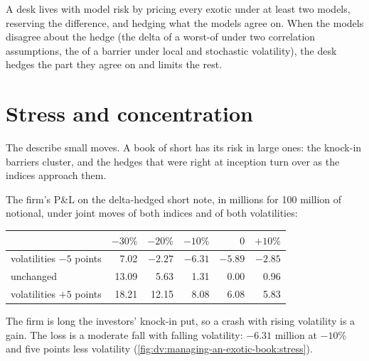 A desk lives with model risk by pricing every exotic under at least two models, reserving the difference, and hedging what the models agree on. When the models
disagree about the hedge (the delta of a worst-of under two correlation assumptions, the  of a barrier under local and stochastic volatility), the desk hedges
the part they agree on and limits the rest.

\section{Stress and concentration}

The  describe small moves. A book of short  has its risk in large ones: the knock-in barriers cluster, and the hedges that were right at inception
turn over as the indices approach them.

\begin{example}\label{ex:dv:managing-an-exotic-book:stress}
The firm's P\&L on the delta-hedged short note, in millions for 100 million of notional, under joint moves of both indices and of both volatilities:
\begin{center}\small
\begin{tabular}{lrrrrr}
\toprule
& $-30\%$ & $-20\%$ & $-10\%$ & $0$ & $+10\%$\\
\midrule
volatilities $-5$ points & 7.02 & $-2.27$ & $-6.31$ & $-5.89$ & $-2.85$\\
unchanged & 13.09 & 5.63 & 1.31 & 0.00 & 0.96\\
volatilities $+5$ points & 18.21 & 12.15 & 8.08 & 6.08 & 5.83\\
\bottomrule
\end{tabular}
\end{center}
The firm is long the investors' knock-in put, so a crash with rising volatility is a gain. The loss is a moderate fall with falling volatility: $-6.31$ million at
$-10\%$ and five points less volatility (\cref{fig:dv:managing-an-exotic-book:stress}).
\end{example}


